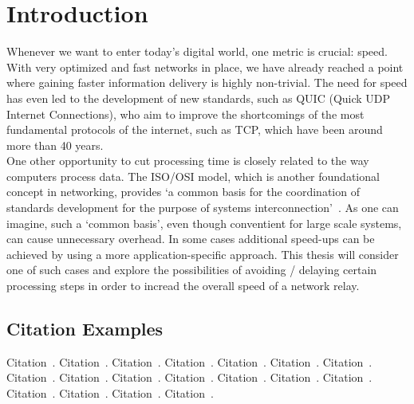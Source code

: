 
\chapter{Introduction}\label{chapter:introduction}

Whenever we want to enter today's digital world, one metric is crucial: speed.
With very optimized and fast networks in place, we have already reached a point where gaining faster information
delivery is highly non-trivial.
The need for speed has even led to the development of new standards, such as QUIC (Quick UDP Internet Connections), 
who aim to improve the shortcomings of the most fundamental protocols of the internet, such as TCP, which have been 
around more than 40 years. 
\\
One other opportunity to cut processing time is closely related to the way computers process data.
The ISO/OSI model, which is another foundational concept in networking, provides `a common basis for the coordination 
of standards development for the purpose of systems interconnection'~\parencite{iso-osi-standard}.
As one can imagine, such a `common basis', even though conventient for large scale systems, can cause unnecessary
overhead.
In some cases additional speed-ups can be achieved by using a more application-specific approach.
This thesis will consider one of such cases and explore the possibilities of avoiding / delaying certain processing
steps in order to incread the overall speed of a network relay.







\section{Citation Examples}
Citation~\parencite{rfc-9000}.
Citation~\parencite{iso-osi-standard}.
Citation~\parencite{draft-moqtransport}.
Citation~\parencite{article-quic-usage}.
Citation~\parencite{internet-quic-usage}.
Citation~\parencite{facebook-quic-usage}.
Citation~\parencite{google-quic-usage}.
Citation~\parencite{quic-nic-offload}.
Citation~\parencite{quic-explained}.
Citation~\parencite{equic-gateway}.
Citation~\parencite{media-streaming-prio-drop}.
Citation~\parencite{quic-nic-offload-patent}.
Citation~\parencite{kernel-bypass-msc-thesis}.
Citation~\parencite{quic-go-repo}.
Citation~\parencite{quic-go-prio-packs-repo}.
Citation~\parencite{adaptive-moq-repo}.
Citation~\parencite{priority-moqtransport-repo}.
Citation~\parencite{fast-relays-thesis-repo}.